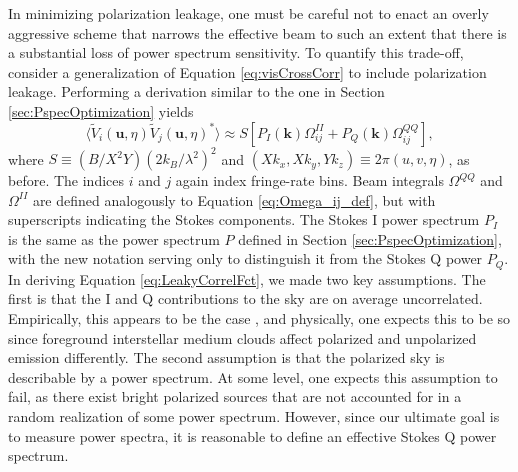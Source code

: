 \documentclass[twocolumn,apj,numberedappendix]{emulateapj}
\begin{document}
In minimizing polarization leakage, one must be careful not to enact an overly aggressive
scheme that narrows the effective beam to such an extent that there is a substantial loss of
power spectrum sensitivity. To quantify this trade-off, consider a generalization of Equation
\eqref{eq:visCrossCorr} to include polarization leakage. Performing a derivation similar to the one
in Section \ref{sec:PspecOptimization} yields
\begin{equation}
\label{eq:LeakyCorrelFct}
\langle \widetilde{V}_i(\mathbf{u},\eta) \widetilde{V}_j(\mathbf{u},\eta)^*\rangle \approx S \left[P_I (\mathbf{k}) \Omega_{ij}^{II} + P_Q (\mathbf{k}) \Omega_{ij}^{QQ}\right],
\end{equation}
where $S \equiv ( B / X^2 Y) ( 2 k_B / \lambda^2 )^2$ and $(X k_x, X k_y, Y k_z) \equiv 2 \pi (u , v, \eta)$, as before. The indices $i$ and $j$ again index fringe-rate
bins. Beam integrals $\Omega^{QQ}$ and $\Omega^{II}$ are defined analogously to Equation \eqref{eq:Omega_ij_def},
but with superscripts indicating the Stokes components. The Stokes I power spectrum $P_I$ is the same as the
power spectrum $P$ defined in Section \ref{sec:PspecOptimization}, with the new notation serving only to
distinguish it from the Stokes Q power $P_Q$. In deriving Equation \eqref{eq:LeakyCorrelFct}, we made two
key assumptions. The first is that the I and Q contributions to the sky are on average uncorrelated. Empirically, 
this appears to be the case \citep{wieringa_et_al1993,gaensler_et_al2001,bernardi_et_al2003}, and physically, one expects this to be so since foreground interstellar medium clouds affect polarized and unpolarized
emission differently.
The second assumption is that the polarized sky is describable by a power spectrum. At some level, one expects
this assumption to fail, as there exist bright polarized sources that are not accounted for in a random realization
of some power spectrum. However, since our ultimate goal is to measure power spectra, it is reasonable to
define an effective Stokes Q power spectrum.
\end{document}
